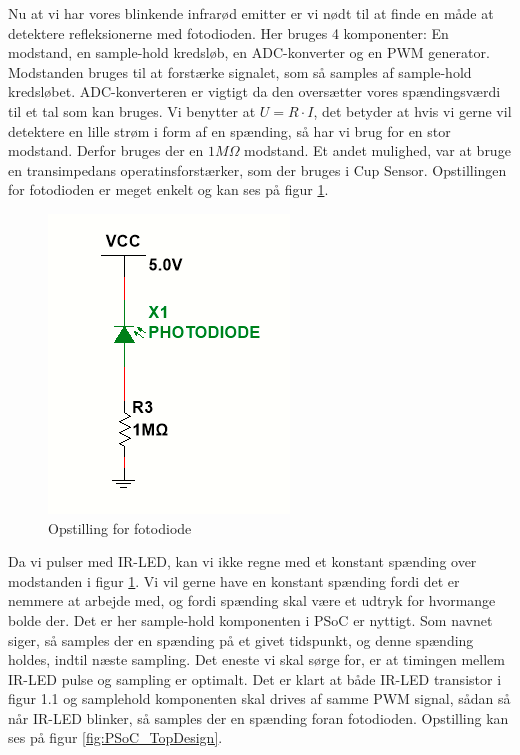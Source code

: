 \documentclass[Rapport/Rapport_main.tex]{subfiles}
\begin{document}
Nu at vi har vores blinkende infrarød emitter er vi nødt til at finde en måde at detektere refleksionerne med fotodioden. Her bruges 4 komponenter: En modstand, en sample-hold kredsløb, en ADC-konverter og en PWM generator. Modstanden bruges til at forstærke signalet, som så samples af sample-hold kredsløbet. ADC-konverteren er vigtigt da den oversætter vores spændingsværdi til et tal som kan bruges.
Vi benytter at $U=R\cdot I$, det betyder at hvis vi gerne vil detektere en lille strøm i form af en spænding, så har vi brug for en stor modstand. Derfor bruges der en $1M\Omega$ modstand. Et andet mulighed, var at bruge en transimpedans operatinsforstærker, som der bruges i Cup Sensor. Opstillingen for fotodioden er meget enkelt og kan ses på figur \ref{fig:fotodiode_opstilling}.
\begin{figure}[H]
    \centering
    \includegraphics{Rapport/BallDispenser/BallCountSensor/graphics/Opstilling1_2.png}
    \caption{Opstilling for fotodiode}
    \label{fig:fotodiode_opstilling}
\end{figure}
Da vi pulser med IR-LED, kan vi ikke regne med et konstant spænding over modstanden i figur \ref{fig:fotodiode_opstilling}. Vi vil gerne have en konstant spænding fordi det er nemmere at arbejde med, og fordi spænding skal være et udtryk for hvormange bolde der. Det er her sample-hold komponenten i PSoC er nyttigt. Som navnet siger, så samples der en spænding på et givet tidspunkt, og denne spænding holdes, indtil næste sampling. Det eneste vi skal sørge for, er at timingen mellem IR-LED pulse og sampling er optimalt. Det er klart at både IR-LED transistor i figur 1.1 og samplehold komponenten skal drives af samme PWM signal, sådan så når IR-LED blinker, så samples der en spænding foran fotodioden. Opstilling kan ses på  figur \ref{fig:PSoC_TopDesign}.
\end{document}
